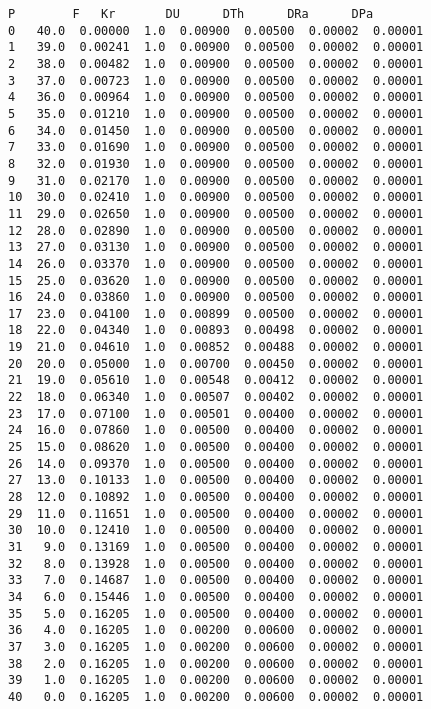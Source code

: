 \documentclass[11pt]{article}
\makeatletter
\newcommand{\boxspacing}{\kern\kvtcb@left@rule\kern\kvtcb@boxsep}
\newcommand{\prompt}[4]{
        \ttfamily\llap{{\color{#2}[#3]:\hspace{3pt}#4}}\vspace{-\baselineskip}
    }
\makeatother
\begin{document}
            \begin{tcolorbox}[breakable, size=fbox, boxrule=.5pt, pad at break*=1mm, opacityfill=0]
\prompt{Out}{outcolor}{25}{\boxspacing}
\begin{Verbatim}[commandchars=\\\{\}]
       P        F   Kr       DU      DTh      DRa      DPa
0   40.0  0.00000  1.0  0.00900  0.00500  0.00002  0.00001
1   39.0  0.00241  1.0  0.00900  0.00500  0.00002  0.00001
2   38.0  0.00482  1.0  0.00900  0.00500  0.00002  0.00001
3   37.0  0.00723  1.0  0.00900  0.00500  0.00002  0.00001
4   36.0  0.00964  1.0  0.00900  0.00500  0.00002  0.00001
5   35.0  0.01210  1.0  0.00900  0.00500  0.00002  0.00001
6   34.0  0.01450  1.0  0.00900  0.00500  0.00002  0.00001
7   33.0  0.01690  1.0  0.00900  0.00500  0.00002  0.00001
8   32.0  0.01930  1.0  0.00900  0.00500  0.00002  0.00001
9   31.0  0.02170  1.0  0.00900  0.00500  0.00002  0.00001
10  30.0  0.02410  1.0  0.00900  0.00500  0.00002  0.00001
11  29.0  0.02650  1.0  0.00900  0.00500  0.00002  0.00001
12  28.0  0.02890  1.0  0.00900  0.00500  0.00002  0.00001
13  27.0  0.03130  1.0  0.00900  0.00500  0.00002  0.00001
14  26.0  0.03370  1.0  0.00900  0.00500  0.00002  0.00001
15  25.0  0.03620  1.0  0.00900  0.00500  0.00002  0.00001
16  24.0  0.03860  1.0  0.00900  0.00500  0.00002  0.00001
17  23.0  0.04100  1.0  0.00899  0.00500  0.00002  0.00001
18  22.0  0.04340  1.0  0.00893  0.00498  0.00002  0.00001
19  21.0  0.04610  1.0  0.00852  0.00488  0.00002  0.00001
20  20.0  0.05000  1.0  0.00700  0.00450  0.00002  0.00001
21  19.0  0.05610  1.0  0.00548  0.00412  0.00002  0.00001
22  18.0  0.06340  1.0  0.00507  0.00402  0.00002  0.00001
23  17.0  0.07100  1.0  0.00501  0.00400  0.00002  0.00001
24  16.0  0.07860  1.0  0.00500  0.00400  0.00002  0.00001
25  15.0  0.08620  1.0  0.00500  0.00400  0.00002  0.00001
26  14.0  0.09370  1.0  0.00500  0.00400  0.00002  0.00001
27  13.0  0.10133  1.0  0.00500  0.00400  0.00002  0.00001
28  12.0  0.10892  1.0  0.00500  0.00400  0.00002  0.00001
29  11.0  0.11651  1.0  0.00500  0.00400  0.00002  0.00001
30  10.0  0.12410  1.0  0.00500  0.00400  0.00002  0.00001
31   9.0  0.13169  1.0  0.00500  0.00400  0.00002  0.00001
32   8.0  0.13928  1.0  0.00500  0.00400  0.00002  0.00001
33   7.0  0.14687  1.0  0.00500  0.00400  0.00002  0.00001
34   6.0  0.15446  1.0  0.00500  0.00400  0.00002  0.00001
35   5.0  0.16205  1.0  0.00500  0.00400  0.00002  0.00001
36   4.0  0.16205  1.0  0.00200  0.00600  0.00002  0.00001
37   3.0  0.16205  1.0  0.00200  0.00600  0.00002  0.00001
38   2.0  0.16205  1.0  0.00200  0.00600  0.00002  0.00001
39   1.0  0.16205  1.0  0.00200  0.00600  0.00002  0.00001
40   0.0  0.16205  1.0  0.00200  0.00600  0.00002  0.00001
\end{Verbatim}
\end{tcolorbox}
        
\end{document}
